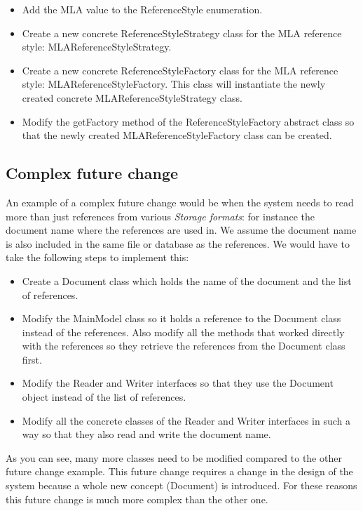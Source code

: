 \documentclass[a4paper]{article}
\begin{document}
\begin{itemize}
	\item Add the MLA value to the ReferenceStyle enumeration.
	\item Create a new concrete ReferenceStyleStrategy class for the MLA reference style: MLAReferenceStyleStrategy.
	\item Create a new concrete ReferenceStyleFactory class for the MLA reference style: MLAReferenceStyleFactory. This class will instantiate the newly created concrete MLAReferenceStyleStrategy class.
	\item Modify the getFactory method of the ReferenceStyleFactory abstract class so that the newly created MLAReferenceStyleFactory class can be created.
\end{itemize}

\subsection{Complex future change}
An example of a complex future change would be when the system needs to read more than just references from various \textit{Storage formats}: for instance the document name where the references are used in. We assume the document name is also included in the same file or database as the references. We would have to take the following steps to implement this:

\begin{itemize}
	\item Create a Document class which holds the name of the document and the list of references.
	\item Modify the MainModel class so it holds a reference to the Document class instead of the references. Also modify all the methods that worked directly with the references so they retrieve the references from the Document class first.
	\item Modify the Reader and Writer interfaces so that they use the Document object instead of the list of references.
	\item Modify all the concrete classes of the Reader and Writer interfaces in such a way so that they also read and write the document name.
\end{itemize}

As you can see, many more classes need to be modified compared to the other future change example. This future change requires a change in the design of the system because a whole new concept (Document) is introduced. For these reasons this future change is much more complex than the other one.
\end{document}
